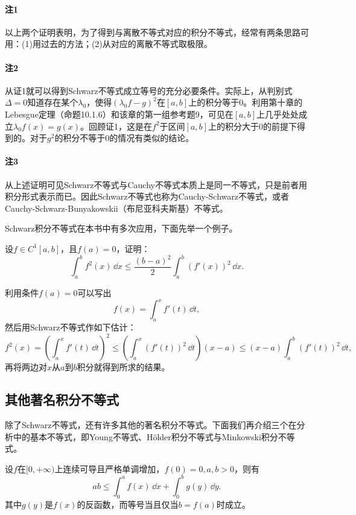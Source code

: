 \paragraph{注1} 以上两个证明表明，为了得到与离散不等式对应的积分不等式，经常有两条思路可用：(1)用过去的方法；(2)从对应的离散不等式取极限。

\paragraph{注2} 从证1就可以得到Schwarz不等式成立等号的充分必要条件。实际上，从判别式$\Delta=0$知道存在某个$\lambda_0$，使得$(\lambda_0f-g)^2$在$[a,b]$上的积分等于0。利用第十章的Lebesgue定理（命题10.1.6）和该章的第一组参考题9，可见在$[a,b]$上几乎处处成立$\lambda_0f(x)=g(x)$。回顾证1，这是在$f^2$于区间$[a,b]$上的积分大于0的前提下得到的。对于$g^2$的积分不等于0的情况有类似的结论。

\paragraph{注3} 从上述证明可见Schwarz不等式与Cauchy不等式本质上是同一不等式，只是前者用积分形式表示而已。因此Schwarz不等式也称为Cauchy-Schwarz不等式，或者Cauchy-Schwarz-Bunyakowskii（布尼亚科夫斯基）不等式。

Schwarz积分不等式在本书中有多次应用，下面先举一个例子。

\begin{xexample}[11.2.3]
设$f\in C^1[a,b]$，且$f(a)=0$，证明：
\[
  \int_a^bf^2(x)\,\dd x\le\frac{(b-a)^2}{2}\int_a^b(f'(x))^2\,\dd x.
\]
\end{xexample}
\begin{xproof}
利用条件$f(a)=0$可以写出
\[
  f(x)=\int_a^xf'(t)\,\dd t,
\]
然后用Schwarz不等式作如下估计：
\[
  f^2(x)=\left(\int_a^xf'(t)\,\dd t\right)^2
  \le\left(\int_a^x(f'(t))^2\,\dd t\right)(x-a)
  \le(x-a)\int_a^b(f'(t))^2\,\dd t,
\]
再将两边对$x$从$a$到$b$积分就得到所求的结果。
\end{xproof}

\subsection{其他著名积分不等式}

除了Schwarz不等式，还有许多其他的著名积分不等式。下面我们再介绍三个在分析中的基本不等式，即Young不等式、Hölder积分不等式与Minkowski积分不等式。

\begin{xproposition}[11.2.3（Young不等式）]
设$f$在$[0,+\infty)$上连续可导且严格单调增加，$f(0)=0,a,b>0$，则有
\begin{equation}
  ab\le\int_0^af(x)\,\dd x+\int_0^bg(y)\,\dd y.
  \tag{11.11}
  \label{eq:11.11}
\end{equation}
其中$g(y)$是$f(x)$的反函数，而等号当且仅当$b=f(a)$时成立。
\end{xproposition}

